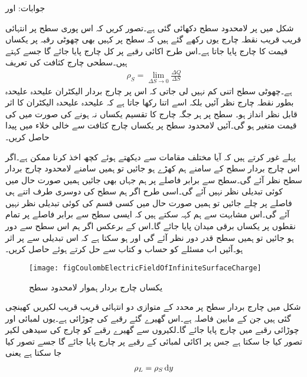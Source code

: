 جوابات: اور 

شکل  میں   پر لامحدود  سطح دکھائی گئی ہے۔تصور کریں کہ اس پوری  سطح پر انتہائی قریب قریب نقطہ چارج یوں رکھے گئے ہیں کہ سطح پر کہیں بھی چھوٹی رقبہ  پر  یکساں قیمت کا چارج  پایا جاتا ہے۔اس طرح اکائی رقبے پر کل  چارج پایا جائے گا جسے   کہتے ہیں۔سطحی چارج کثافت کی تعریف
\begin{align}\label{مساوات_کولومب_سطحی_کثافت_تعریف}
\rho_S=\lim_{\Delta S \to 0}\frac{\Delta Q}{\Delta S}
\end{align}
ہے۔چھوٹی سطح اتنی کم نہیں لی جاتی کہ اس پر چارج بردار الیکٹران علیحدہ علیحدہ بطور نقطہ چارج نظر آئیں بلکہ اسے اتنا رکھا جاتا ہے کہ علیحدہ علیحدہ الیکٹران کا اثر قابل نظر انداز ہو۔ سطح پر ہر جگہ چارج کا تقسیم یکساں نہ ہونے کی صورت میں  کی قیمت متغیر ہو گی۔آئیں لامحدود سطح پر یکساں چارج کثافت سے خالی خلاء میں  پیدا  حاصل کریں۔

پہلے غور کرتے ہیں کہ آیا مختلف مقامات سے  دیکھتے ہوئے کچھ اخذ کرنا ممکن ہے۔اگر اس چارج بردار سطح کے سامنے ہم کھڑے ہو جائیں تو ہمیں سامنے لامحدود چارج بردار سطح نظر آئے گی۔سطح سے برابر فاصلے پر ہم جہاں بھی جائیں ہمیں صورت حال میں کوئی تبدیلی نظر نہیں آئے گی۔اسی طرح اگر ہم سطح کی دوسری طرف اتنے ہی فاصلے پر چلے جائیں تو ہمیں صورت حال میں کسی قسم کی کوئی تبدیلی نظر نہیں آئے گی۔اس مشابہت سے ہم کہہ سکتے ہیں کہ ایسی سطح سے برابر فاصلے پر تمام نقطوں  پر یکساں برقی میدان پایا جائے گا۔اس کے برعکس اگر ہم اس سطح سے دور ہو جائیں تو ہمیں سطح قدر دور نظر آئے گی اور ہو سکتا ہے کہ اس تبدیلی سے  پر اثر ہو۔آئیں اب مسئلے کو حساب و کتاب سے حل کرتے ہوئے  حاصل کریں۔
\begin{figure}
\centering
\texttt{[image: figCoulombElectricFieldOfInfiniteSurfaceCharge]}
\caption{یکساں چارج بردار ہموار لامحدود سطح}
\label{شکل_کولومب_لامحدود_سطح_پر_چارج}
\end{figure}

شکل   میں چارج بردار سطح پر   محدد کے متوازی دو انتہائی قریب قریب لکیریں کھینچی گئی ہیں جن کے مابین فاصلہ  ہے۔اس گھیرے گئے رقبے کی چوڑائی  ہے۔یوں  لمبائی اور  چوڑائی رقبے میں  چارج پایا جائے گا۔لکیروں سے گھیرے رقبے کو چارج کی سیدھی لکیر تصور کیا جا سکتا ہے جس پر اکائی لمبائی کے رقبے پر  چارج پایا جائے گا جسے  تصور کیا جا سکتا ہے یعنی
\begin{align}
\rho_L=\rho_S \dif y
\end{align}

